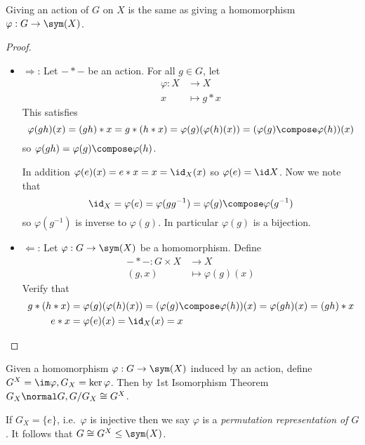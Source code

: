 \documentclass[a4paper]{article}
\begin{document}
\begin{lemma}
  Giving an action of \(G\) on \(X\) is the same as giving a homomorphism \(\varphi: G \to \sym(X)\).
\end{lemma}

\begin{proof}\leavevmode
  \begin{itemize}
  \item \(\Rightarrow\): Let \(- * -\) be an action. For all \(g \in G\), let
    \begin{align*}
      \varphi: X &\to X \\
      x &\mapsto g * x
    \end{align*}
    This satisfies
    \[
      \varphi(gh)(x) = (gh) * x = g * (h * x) = \varphi(g)(\varphi(h)(x)) = (\varphi(g) \compose \varphi(h))(x)
    \]
    so \(\varphi(gh) = \varphi(g) \compose \varphi(h)\).

    In addition \(\varphi(e)(x) = e * x = x = \id_X(x)\) so \(\varphi(e) = \id X\). Now we note that
    \[
      \id_X = \varphi(e) = \varphi(gg^{-1}) = \varphi(g) \compose \varphi(g^{-1})
    \]
    so \(\varphi(g^{-1})\) is inverse to \(\varphi(g)\). In particular \(\varphi(g)\) is a bijection.
  \item \(\Leftarrow\): Let \(\varphi: G \to \sym(X)\) be a homomorphism. Define
    \begin{align*}
      - * -: G \times X &\to X \\
      (g, x) &\mapsto \varphi(g)(x)
    \end{align*}
    Verify that
    \begin{align*}
      g * (h * x) &= \varphi(g)(\varphi(h)(x)) = (\varphi(g) \compose \varphi(h))(x) = \varphi(gh)(x) = (gh) * x \\
      e * x &= \varphi(e)(x) = \id_X(x) = x
    \end{align*}
  \end{itemize}
\end{proof}

Given a homomorphism \(\varphi: G \to \sym(X)\) induced by an action, define \(G^X = \im \varphi, G_X = \ker \varphi\). Then by 1st Isomorphism Theorem \(G_X \normal G, G/G_X \cong G^X\).

If \(G_X = \{e\}\), i.e.\ \(\varphi\) is injective then we say \(\varphi\) is a \emph{permutation representation of \(G\)}. It follows that \(G \cong G^X \leq \sym(X)\).
\end{document}
